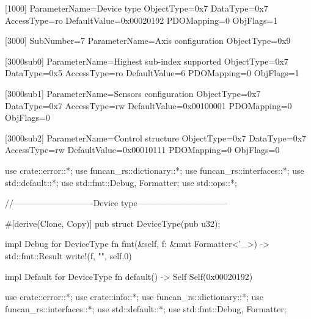 \documentclass[a4paper,12pt]{article}
\begin{document}
\begin{appendices}
\begin{flushleft}
\label{app:maxon-eds}
\begin{MyCodes}

[1000]
ParameterName=Device type
ObjectType=0x7
DataType=0x7
AccessType=ro
DefaultValue=0x00020192
PDOMapping=0
ObjFlags=1

[3000]
SubNumber=7
ParameterName=Axis configuration
ObjectType=0x9

[3000sub0]
ParameterName=Highest sub-index supported
ObjectType=0x7
DataType=0x5
AccessType=ro
DefaultValue=6
PDOMapping=0
ObjFlags=1

[3000sub1]
ParameterName=Sensors configuration
ObjectType=0x7
DataType=0x7
AccessType=rw
DefaultValue=0x00100001
PDOMapping=0
ObjFlags=0

[3000sub2]
ParameterName=Control structure
ObjectType=0x7
DataType=0x7
AccessType=rw
DefaultValue=0x00010111
PDOMapping=0
ObjFlags=0

\end{MyCodes}
\end{flushleft}

\begin{flushleft}
\label{app:info-rs}
\begin{MyCodes}
use crate::error::*;
use funcan_rs::dictionary::*;
use funcan_rs::interfaces::*;
use std::default::*;
use std::fmt::{Debug, Formatter};
use std::ops::*;

//----------------------------Device type--------------------------------

#[derive(Clone, Copy)]
pub struct DeviceType(pub u32);

impl Debug for DeviceType {
    fn fmt(&self, f: &mut Formatter<'_>) -> std::fmt::Result {
        write!(f, "{}", self.0)
    }
}

impl Default for DeviceType {
    fn default() -> Self {
        Self(0x00020192)
    }
}

\end{MyCodes}
\end{flushleft}

\begin{flushleft}
\label{app:maxon-rs}
\begin{MyCodes}
use crate::error::*;
use crate::info::*;
use funcan_rs::dictionary::*;
use funcan_rs::interfaces::*;
use std::default::*;
use std::fmt::{Debug, Formatter};


\end{MyCodes}
\end{flushleft}
\end{appendices}
\end{document}
